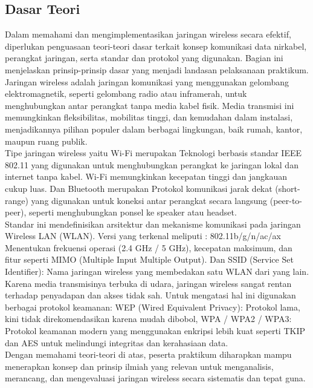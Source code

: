 \subsection{Dasar Teori}
Dalam memahami dan mengimplementasikan jaringan wireless secara efektif, diperlukan penguasaan teori-teori dasar terkait konsep komunikasi data nirkabel, perangkat jaringan, serta standar dan protokol yang digunakan. Bagian ini menjelaskan prinsip-prinsip dasar yang menjadi landasan pelaksanaan praktikum. \\ Jaringan wireless adalah jaringan komunikasi yang menggunakan gelombang elektromagnetik, seperti gelombang radio atau inframerah, untuk menghubungkan antar perangkat tanpa media kabel fisik. Media transmisi ini memungkinkan fleksibilitas, mobilitas tinggi, dan kemudahan dalam instalasi, menjadikannya pilihan populer dalam berbagai lingkungan, baik rumah, kantor, maupun ruang publik. \\ Tipe jaringan wireless yaitu Wi-Fi merupakan Teknologi berbasis standar IEEE 802.11 yang digunakan untuk menghubungkan perangkat ke jaringan lokal dan internet tanpa kabel. Wi-Fi memungkinkan kecepatan tinggi dan jangkauan cukup luas. Dan Bluetooth merupakan Protokol komunikasi jarak dekat (short-range) yang digunakan untuk koneksi antar perangkat secara langsung (peer-to-peer), seperti menghubungkan ponsel ke speaker atau headset. \\ Standar ini mendefinisikan arsitektur dan mekanisme komunikasi pada jaringan Wireless LAN (WLAN). Versi yang terkenal meliputi : 802.11b/g/n/ac/ax Menentukan frekuensi operasi (2.4 GHz / 5 GHz), kecepatan maksimum, dan fitur seperti MIMO (Multiple Input Multiple Output). Dan SSID (Service Set Identifier): Nama jaringan wireless yang membedakan satu WLAN dari yang lain. \\ Karena media transmisinya terbuka di udara, jaringan wireless sangat rentan terhadap penyadapan dan akses tidak sah. Untuk mengatasi hal ini digunakan berbagai protokol keamanan: WEP (Wired Equivalent Privacy): Protokol lama, kini tidak direkomendasikan karena mudah dibobol, WPA / WPA2 / WPA3: Protokol keamanan modern yang menggunakan enkripsi lebih kuat seperti TKIP dan AES untuk melindungi integritas dan kerahasiaan data. \\ Dengan memahami teori-teori di atas, peserta praktikum diharapkan mampu menerapkan konsep dan prinsip ilmiah yang relevan untuk menganalisis, merancang, dan mengevaluasi jaringan wireless secara sistematis dan tepat guna.

